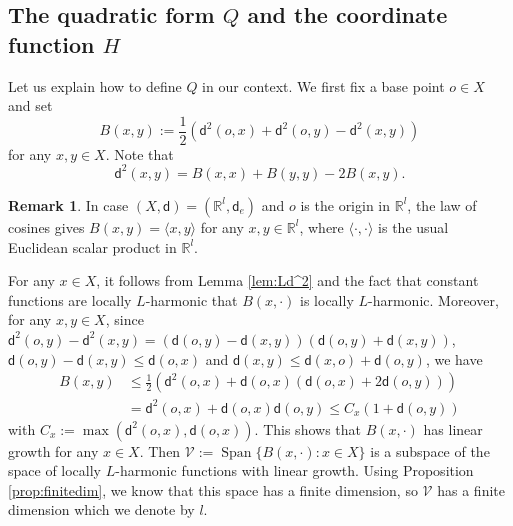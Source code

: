 \documentclass[10pt]{amsart}
\theoremstyle{plain}
\theoremstyle{definition}
\newtheorem{remark}[theorem]{Remark}
\newcommand{\setR}{\mathbb{R}}
\newcommand{\cV}{\mathcal{V}}
\newcommand{\scal}[2]{\ensuremath{\langle #1, #2 \rangle}}
\newcommand{\dist}{\mathsf{d}}
\DeclareMathOperator{\Span}{Span}
\begin{document}
\subsection{The quadratic form $Q$ and the coordinate function $H$}\label{subsec:4.1}

Let us explain how to define $Q$ in our context. We first fix a base point $o \in X$ and set
\[
B(x,y):=\frac{1}{2}(\dist^2(o,x)+\dist^2(o,y)-\dist^2(x,y))
\]for any $x,y \in X$. Note that
\begin{equation}\label{eq:D6.1}
\dist^2(x,y)= B(x,x)+B(y,y)-2B(x,y).
\end{equation}

\begin{remark}
In case $(X,\dist)=(\setR^l,\dist_{e})$ and $o$ is the origin in $\setR^l$, the law of cosines gives $B(x,y)=\scal{x}{y}$ for any $x,y \in \setR^l$, where $\scal{\cdot}{\cdot}$ is the usual Euclidean scalar product in $\setR^l$.
\end{remark}

For any $x \in X$, it follows from Lemma \ref{lem:Ld^2} and the fact that constant functions are locally $L$-harmonic that $B(x,\cdot)$ is locally $L$-harmonic. Moreover, for any $x,y \in X$, since $\dist^2(o,y)-\dist^2(x,y) = (\dist(o,y)-\dist(x,y))(\dist(o,y)+\dist(x,y))$, $\dist(o,y)-\dist(x,y)\le \dist(o,x)$ and $\dist(x,y)\le \dist(x,o)+\dist(o,y)$, we have
\begin{align*}
B(x,y) & \le \frac{1}{2}(\dist^2(o,x)+\dist(o,x)(\dist(o,x)+2\dist(o,y)))\\
& = \dist^2(o,x)+\dist(o,x)\dist(o,y) \le C_x(1+\dist(o,y))
\end{align*}
with $C_x:=\max(\dist^2(o,x),\dist(o,x))$. This shows that $B(x,\cdot)$ has linear growth for any $x \in X$. Then $\cV:=\Span\{B(x,\cdot): x \in X\}$ is a subspace of the space of locally $L$\nobreakdash-harmonic functions with linear growth. Using Proposition \ref{prop:finitedim}, we know that this space has a finite dimension, so $\cV$ has a finite dimension which we denote by $l$.
\end{document}
